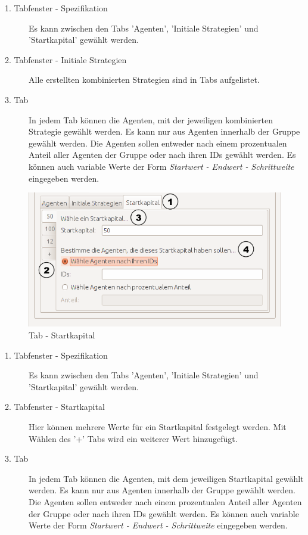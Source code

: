 \begin{description}

\item[1. Tabfenster - Spezifikation] Es kann zwischen den Tabs 'Agenten', 'Initiale Strategien' und 'Startkapital' gewählt werden.  

\item[2. Tabfenster - Initiale Strategien] Alle erstellten kombinierten Strategien sind in Tabs aufgelistet. 

\item[3. Tab] In jedem Tab können die Agenten, mit der jeweiligen kombinierten Strategie gewählt werden. Es kann nur aus Agenten innerhalb der Gruppe gewählt werden. Die Agenten sollen entweder nach einem prozentualen Anteil aller Agenten der Gruppe oder nach ihren IDs gewählt werden. Es können auch variable Werte der Form \textit{Startwert - Endwert - Schrittweite} eingegeben werden.

\end{description}


\begin{figure}[!hp] 
  \centering
     \includegraphics[width=1.0\textwidth]{GUI_Entwurf/InitialisierungBearbeiten3.png}
  \caption{Tab - Startkapital}
  \label{fig:Bild1}
\end{figure}

\begin{description}

\item[1. Tabfenster - Spezifikation] Es kann zwischen den Tabs 'Agenten', 'Initiale Strategien' und 'Startkapital' gewählt werden.  

\item[2. Tabfenster - Startkapital] Hier können mehrere Werte für ein Startkapital festgelegt werden. Mit Wählen des '+' Tabs wird ein weiterer Wert hinzugefügt.

\item[3. Tab] In jedem Tab können die Agenten, mit dem jeweiligen Startkapital gewählt werden. Es kann nur aus Agenten innerhalb der Gruppe gewählt werden. Die Agenten sollen entweder nach einem prozentualen Anteil aller Agenten der Gruppe oder nach ihren IDs gewählt werden. Es können auch variable Werte der Form \textit{Startwert - Endwert - Schrittweite} eingegeben werden.

\end{description}

